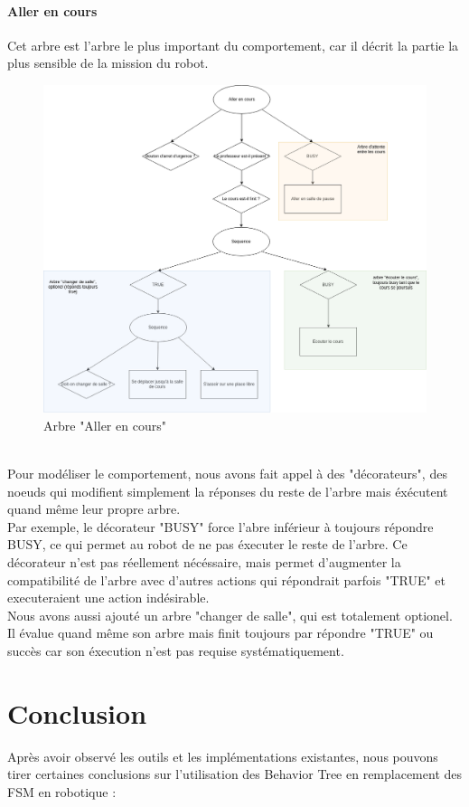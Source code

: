 \documentclass[titlepage]{article}
\begin{document}
	\paragraph{Aller en cours}
	Cet arbre est l'arbre le plus important du comportement, car il décrit la partie la plus sensible de la mission du robot.
	\begin{figure}[h!]
		\centering
		\includegraphics[width=\linewidth]{img/BT_5.png}
		\caption{Arbre "Aller en cours"}
		\label{fig:exemple_4}
	\end{figure}
	\\
	Pour modéliser le comportement, nous avons fait appel à des "décorateurs", des noeuds qui modifient simplement la réponses du reste de l'arbre mais éxécutent quand même leur propre arbre. 
	\\
	Par exemple, le décorateur "BUSY" force l'abre inférieur à toujours répondre BUSY, ce qui permet au robot de ne pas éxecuter le reste de l'arbre. Ce décorateur n'est pas réellement nécéssaire, mais permet d'augmenter la compatibilité de l'arbre avec d'autres actions qui répondrait parfois "TRUE" et executeraient une action indésirable. 
	\\
	Nous avons aussi ajouté un arbre "changer de salle", qui est totalement optionel. Il  évalue quand même son arbre mais finit toujours par répondre "TRUE" ou succès car son éxecution n'est pas requise systématiquement.
	\clearpage
	\section{Conclusion}
	Après avoir observé les outils et les implémentations existantes, nous pouvons tirer certaines conclusions sur l'utilisation des Behavior Tree en remplacement des FSM en robotique :
\end{document}
